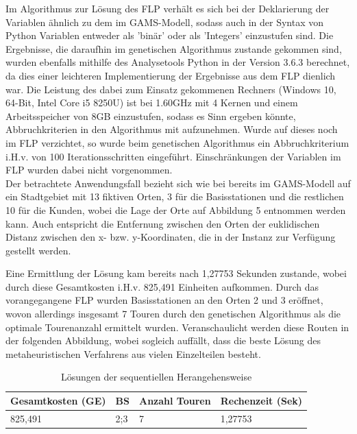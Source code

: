 \documentclass[a4paper,12pt,parskip,bibtotoc,liststotoc]{article}
\begin{document}
Im Algorithmus zur Lösung des FLP verhält es sich bei der Deklarierung der Variablen ähnlich zu dem im GAMS-Modell, sodass auch in der Syntax von Python Variablen entweder als 'binär' oder als 'Integers' einzustufen sind.
Die Ergebnisse, die daraufhin im genetischen Algorithmus zustande gekommen sind, wurden ebenfalls mithilfe des Analysetools Python in der Version 3.6.3 berechnet, da dies einer leichteren Implementierung der Ergebnisse aus dem FLP dienlich war.
Die Leistung des dabei zum Einsatz gekommenen Rechners (Windows 10, 64-Bit, Intel Core i5 8250U) ist bei 1.60GHz mit 4 Kernen und einem Arbeitsspeicher von 8GB einzustufen, sodass es Sinn ergeben könnte, Abbruchkriterien in den Algorithmus mit aufzunehmen.
Wurde auf dieses noch im FLP verzichtet, so wurde beim genetischen Algorithmus ein Abbruchkriterium i.H.v. von 100 Iterationsschritten eingeführt.
Einschränkungen der Variablen im FLP wurden dabei nicht vorgenommen.\\

Der betrachtete Anwendungsfall bezieht sich wie bei bereits im GAMS-Modell auf ein Stadtgebiet mit 13 fiktiven Orten, 3 für die Basisstationen und die restlichen 10 für die Kunden, wobei die Lage der Orte auf Abbildung 5 entnommen werden kann.
Auch entspricht die Entfernung zwischen den Orten der euklidischen Distanz zwischen den x- bzw. y-Koordinaten, die in der Instanz zur Verfügung gestellt werden.

Eine Ermittlung der Lösung kam bereits nach 1,27753 Sekunden zustande, wobei durch diese Gesamtkosten i.H.v. 825,491 Einheiten aufkommen.
Durch das vorangegangene FLP wurden Basisstationen an den Orten 2 und 3 eröffnet, wovon allerdings insgesamt 7 Touren durch den genetischen Algorithmus als die optimale Tourenanzahl ermittelt wurden.
Veranschaulicht werden diese Routen in der folgenden Abbildung, wobei sogleich auffällt, dass die beste Lösung des metaheuristischen Verfahrens aus vielen Einzelteilen besteht.  



\begin{table}[h!]
    \vspace*{-3mm}
    \hspace*{2mm}
  \renewcommand{\arraystretch}{1,5}
  \caption{Lösungen der sequentiellen Herangehensweise
  }
  \begin{center}
 
    \begin{tabular}{|l|l|l|l|} \hline
    \textbf{Gesamtkosten (GE)} &\textbf{BS} &\textbf{Anzahl Touren}&\textbf{ Rechenzeit} (Sek)\\\hline
     825,491 & 2;3 & 7 & 1,27753\\\hline   
	\end{tabular}
	  \end{center}
\end{table}
\end{document}

